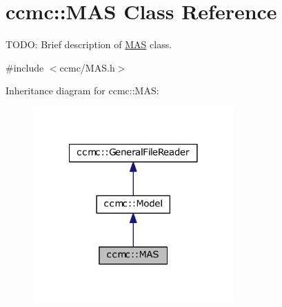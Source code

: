\hypertarget{classccmc_1_1_m_a_s}{\section{ccmc\-:\-:M\-A\-S Class Reference}
\label{classccmc_1_1_m_a_s}
}


T\-O\-D\-O\-: Brief description of \hyperlink{classccmc_1_1_m_a_s}{M\-A\-S} class.  




{\ttfamily \#include $<$ccmc/\-M\-A\-S.\-h$>$}



Inheritance diagram for ccmc\-:\-:M\-A\-S\-:
\nopagebreak
\begin{figure}[H]
\begin{center}
\leavevmode
\includegraphics[width=218pt]{classccmc_1_1_m_a_s__inherit__graph}
\end{center}
\end{figure}


